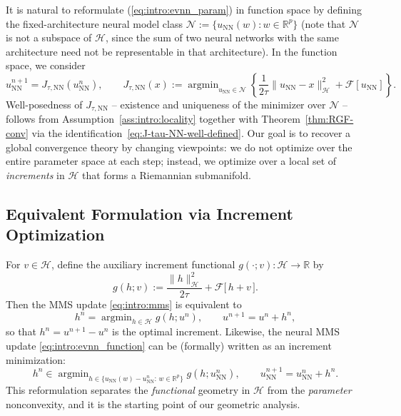 \documentclass[twoside,11pt]{article}
\newcommand{\NN}{\mathrm{NN}}
\newcommand{\argmin}{\mathop{\mathrm{arg min}}}
\newcommand{\calF}{\mathcal{F}}
\newcommand{\calH}{\mathcal{H}}
\newcommand{\calN}{\mathcal{N}}
\begin{document}
It is natural to reformulate (\ref{eq:intro:evnn_param}) in function space by defining the fixed-architecture neural model class $\mathcal{N}:=\{ u_{\NN}(w):w \in \mathbb{R}^p \}$ (note that $\mathcal{N}$ is not a subspace of $\mathcal{H}$, since the sum of two neural networks with the same architecture need not be representable in that architecture). In the function space, we consider
\begin{equation}\label{eq:intro:evnn_function}
u^{n+1}_{\NN} = J_{\tau,\NN}(u^n_{\NN}),
\qquad
J_{\tau,\NN}(x):=\argmin_{u_{\NN}\in \mathcal{N}}\left\{\frac{1}{2\tau}\|u_{\NN}-x\|_\calH^2 + \calF[u_{\NN}]\right\}.
\end{equation}
Well-posedness of $J_{\tau,\NN}$ -- existence and uniqueness of the minimizer over $\calN$ -- follows from Assumption~\ref{ass:intro:locality} together with Theorem~\ref{thm:RGF-conv} via the identification~\eqref{eq:J-tau-NN-well-defined}. Our goal is to recover a global convergence theory by changing viewpoints: we do not optimize over the entire parameter space at each step; instead, we optimize over a local set of \emph{increments} in $\calH$ that forms a Riemannian submanifold.

\subsection{Equivalent Formulation via Increment Optimization}
For $v\in\calH$, define the auxiliary increment functional $g(\cdot;v):\calH\to\mathbb{R}$ by
\begin{equation}\label{eq:intro:g_def}
g(h;v) := \frac{\|h\|_\calH^2}{2\tau}+\calF\bigl[\,h+v\,\bigr].
\end{equation}
Then the MMS update \eqref{eq:intro:mms} is equivalent to
\begin{equation*}
h^n = \argmin_{h\in \calH} g(h;u^n),
\qquad
u^{n+1} = u^n + h^n,
\end{equation*}
so that $h^n = u^{n+1}-u^n$ is the optimal increment. Likewise, the neural MMS update \eqref{eq:intro:evnn_function} can be (formally) written as an increment minimization:
\begin{equation}\label{eq:intro:evnn_increment}
h^n \in \argmin_{h\in \{u_{\NN}(w)-u^n_{\NN}:\,w\in\mathbb{R}^p\}} g(h;u^n_{\NN}),
\qquad
u^{n+1}_{\NN}=u^n_{\NN}+h^n.
\end{equation}
This reformulation separates the \emph{functional} geometry in $\calH$ from the \emph{parameter} nonconvexity, and it is the starting point of our geometric analysis.
\end{document}
